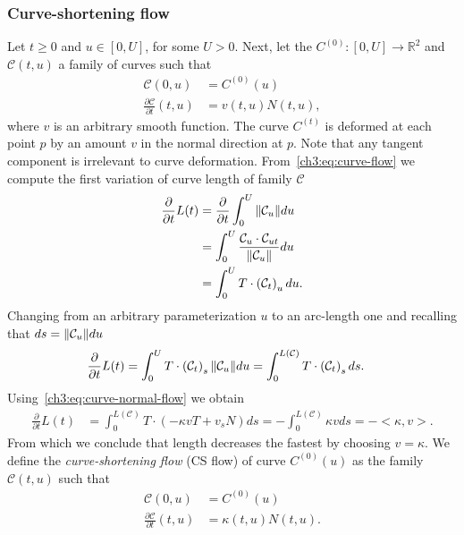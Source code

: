 \subsubsection{Curve-shortening flow}
\label{ch3:sec:curve-shortening-flow}

Let $ t\geq 0$ and $u \in [0,U]$, for some $U>0$. Next, let the $C^{(0)}:[0,U] \rightarrow \mathbb{R}^2$ and $\mathcal{C}(t,u)$ a family of curves such that
\begin{align}
	\mathcal{C}(0,u) & = C^{(0)}(u) \\
	\frac{\partial \mathcal{C}}{\partial t}(t,u) &= v(t,u) N(t,u),
	\label{ch3:eq:curve-normal-flow}
\end{align}
%
where $v$ is an arbitrary smooth function. The curve ${C}^{(t)}$ is deformed at each point $p$ by an amount $v$ in the normal direction at $p$. Note that any tangent component is irrelevant to curve deformation. From~\cref{ch3:eq:curve-flow} we compute the first variation of curve length of family $\mathcal{C}$
\begin{align*}
	\frac{\partial }{\partial t}L(t) &= \frac{\partial}{\partial t}\int_{0}^{U}{\lVert \mathcal{C}_u \rVert du} \\
	&= \int_{0}^{U}{ \frac{ \mathcal{C}_u \cdot \mathcal{C}_{ut} }{\lVert\mathcal{C}_u\rVert } du} \\
	&= \int_{0}^{U}{ T \cdot \left( \mathcal{C}_{t} \right)_u  du}.
\end{align*}
%
Changing from an arbitrary parameterization $u$ to an arc-length one and recalling that $ds=\lVert \mathcal{C}_u \rVert  du$
\begin{align*}
	\frac{\partial }{\partial t}L(t) &= \int_{0}^{U}{ T \cdot \left( \mathcal{C}_{t} \right)_s \lVert \mathcal{C}_u \rVert  du} = \int_{0}^{L(\mathcal{C})}{ T \cdot \left( \mathcal{C}_{t} \right)_s ds}. 	
\end{align*}
%
Using~\cref{ch3:eq:curve-normal-flow} we obtain
\begin{align*}
	\frac{\partial }{\partial t}L(t) &= \int_{0}^{L(\mathcal{C})}{T \cdot (-\kappa vT + v_sN) ds } = - \int_{0}^{L(\mathcal{C})}{\kappa v ds} = -<\kappa,v>.
\end{align*}
%
From which we conclude that length decreases the fastest by choosing $v=\kappa$. We define the \emph{curve-shortening flow} (CS flow) of curve $C^{(0)}(u)$ as the family $\mathcal{C}(t,u)$ such that
\begin{align}
	\mathcal{C}(0,u) & = C^{(0)}(u) \\
	\frac{\partial \mathcal{C}}{\partial t}(t,u) &= \kappa(t,u) N(t,u).
	\label{ch3:eq:curve-shortening-flow}
\end{align}
